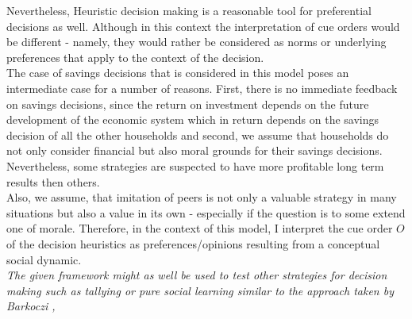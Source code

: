 Nevertheless, Heuristic decision making is a reasonable tool for preferential decisions as well. Although in this context the interpretation of cue orders would be different - namely, they would rather be considered as norms or underlying preferences that apply to the context of the decision. \\
The case of savings decisions that is considered in this model poses an intermediate case for a number of reasons. First, there is no immediate feedback on savings decisions, since the return on investment depends on the future development of the economic system which in return depends on the savings decision of all the other households and second, we assume that households do not only consider financial but also moral grounds for their savings decisions. Nevertheless, some strategies are suspected to have more profitable long term results then others.\\
Also, we assume, that imitation of peers is not only a valuable strategy in many situations but also a value in its own - especially if the question is to some extend one of morale. 
Therefore, in the context of this model, I interpret the cue order $O$ of the decision heuristics as preferences/opinions resulting from a conceptual social dynamic. \\

\textit{The given framework might as well be used to test other strategies for decision making such as tallying or pure social learning similar to the approach taken by Barkoczi \cite{Barkoczi2013a}, \cite{Barkoczi2016}}

